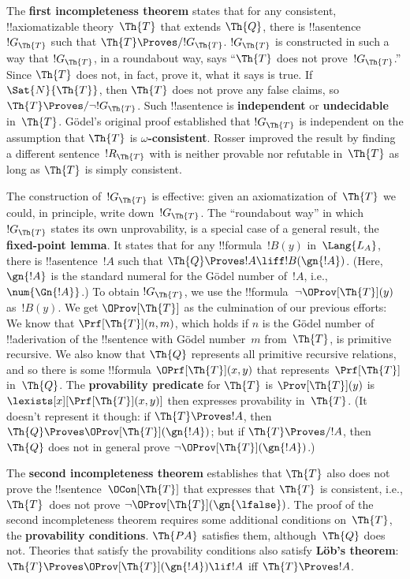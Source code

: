 The \textbf{first incompleteness theorem} states that for any
consistent, !!{axiomatizable} theory~$\Th{T}$ that extends $\Th{Q}$,
there is !!a{sentence}~$!G_\Th{T}$ such that $\Th{T} \Proves/
!G_\Th{T}$. $!G_\Th{T}$ is constructed in such a way that $!G_\Th{T}$,
in a roundabout way, says ``$\Th{T}$ does not prove~$!G_\Th{T}$.''
Since $\Th{T}$ does not, in fact, prove it, what it says is true. If
$\Sat{N}{\Th{T}}$, then $\Th{T}$ does not prove any false claims, so
$\Th{T} \Proves/ \lnot !G_\Th{T}$. Such !!a{sentence} is
\textbf{independent} or \textbf{undecidable} in~$\Th{T}$.  G\"odel's
original proof established that $!G_\Th{T}$ is independent on the
assumption that $\Th{T}$ is \textbf{$\omega$-consistent}. Rosser
improved the result by finding a different sentence~$!R_\Th{T}$ with
is neither provable nor refutable in~$\Th{T}$ as long as $\Th{T}$ is
simply consistent.

The construction of~$!G_\Th{T}$ is effective: given an axiomatization
of~$\Th{T}$ we could, in principle, write down~$!G_\Th{T}$. The
``roundabout way'' in which $!G_\Th{T}$ states its own unprovability,
is a special case of a general result, the \textbf{fixed-point
  lemma}. It states that for any !!{formula}~$!B(y)$ in~$\Lang{L_A}$,
there is !!a{sentence}~$!A$ such that $\Th{Q} \Proves !A \liff
!B(\gn{!A})$. (Here, $\gn{!A}$ is the standard numeral for the G\"odel
number of~$!A$, i.e., $\num{\Gn{!A}}$.)  To obtain $!G_\Th{T}$, we use
the !!{formula}~$\lnot\OProv[\Th{T}](y)$ as~$!B(y)$.  We get
$\OProv[\Th{T}]$ as the culmination of our previous efforts: We know
that $\Prf[\Th{T}](n, m)$, which holds if $n$ is the G\"odel number of
!!a{derivation} of the !!{sentence} with G\"odel number~$m$
from~$\Th{T}$, is primitive recursive. We also know that $\Th{Q}$
represents all primitive recursive relations, and so there is some
!!{formula} $\OPrf[\Th{T}](x,y)$ that represents~$\Prf[\Th{T}]$
in~$\Th{Q}$.  The \textbf{provability predicate} for $\Th{T}$ is
$\Prov[\Th{T}](y)$ is $\lexists[x][\Prf[\Th{T}](x, y)]$ then expresses
provability in~$\Th{T}$. (It doesn't represent it though: if $\Th{T}
\Proves !A$, then $\Th{Q} \Proves \OProv[\Th{T}](\gn{!A})$; but if
$\Th{T} \Proves/ !A$, then $\Th{Q}$ does not in general prove $\lnot
\OProv[\Th{T}](\gn{!A})$.)

The \textbf{second incompleteness theorem} establishes that $\Th{T}$
also does not prove the !!{sentence}~$\OCon[\Th{T}]$ that expresses
that $\Th{T}$ is consistent, i.e., $\Th{T}$~does not prove $\lnot
\OProv[\Th{T}](\gn{\lfalse})$.  The proof of the second incompleteness
theorem requires some additional conditions on~$\Th{T}$, the
\textbf{provability conditions}. $\Th{PA}$ satisfies them,
although~$\Th{Q}$ does not. Theories that satisfy the provability
conditions also satisfy \textbf{L\"ob's theorem}: $\Th{T} \Proves
\OProv[\Th{T}](\gn{!A}) \lif !A$ iff $\Th{T} \Proves !A$.

